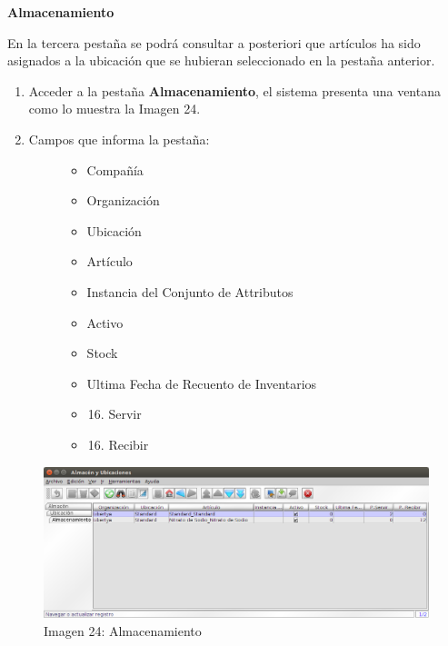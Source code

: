\documentclass[letterpaper,10pt,spanish]{sphinxmanual}
\begin{document}
\textbf{Almacenamiento}

En la tercera pestaña se podrá consultar a posteriori que artículos ha sido  asignados a la ubicación que se hubieran seleccionado en la pestaña anterior.
\begin{enumerate}
\item {} 
Acceder a la pestaña \textbf{Almacenamiento}, el sistema presenta una ventana como lo muestra la Imagen 24.

\item {} \begin{description}
\item[{Campos que informa la pestaña:}] \leavevmode\begin{itemize}
\item {} 
Compañía

\item {} 
Organización

\item {} 
Ubicación

\item {} 
Artículo

\item {} 
Instancia del Conjunto de Attributos

\item {} 
Activo

\item {} 
Stock

\item {} 
Ultima Fecha de Recuento de Inventarios

\item {} \begin{enumerate}
\setcounter{enumi}{15}
\item {} 
Servir

\end{enumerate}

\item {} \begin{enumerate}
\setcounter{enumi}{15}
\item {} 
Recibir

\end{enumerate}

\end{itemize}

\end{description}

\end{enumerate}
\begin{figure}[htbp]
\centering
\capstart

\includegraphics{ly_alm3.png}
\caption{Imagen 24: Almacenamiento}\end{figure}
\end{document}
